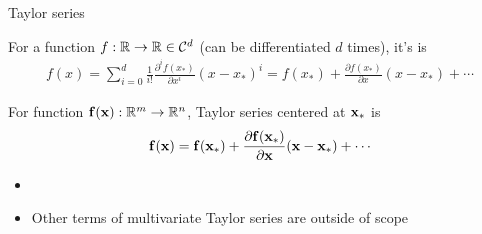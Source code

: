 \documentclass[8pt, aspectratio=149]{beamer}
\begin{document}
\begin{frame}{Taylor series}

    For a function \( f : \mathbb{R} \to \mathbb{R} \in \mathcal{C}^d \) (can be differentiated \( d \) times), 
    it's  is  
    \begin{align*}
        f(x) 
        = \sum_{i = 0}^d \frac{1}{i!} \frac{\partial^i f(x_*)}{\partial x^i} (x - x_*)^i 
        = f(x_*) + \frac{\partial f(x_*)}{\partial x} (x - x_*) + \cdots 
    \end{align*}  

    \vspace{1em} 
    For function \( \mVector{f}(\mVector{x}) : \R^m \to \R^n \), Taylor series centered at \( \mVector{x}_* \) is 
    \begin{align*}
        \mVector{f}(\mVector{x}) 
        = \mVector{f}(\mVector{x}_*) + \frac{\partial \mVector{f}(\mVector{x_*})}{\partial \mVector{x}} ( \mVector{x} - \mVector{x}_* ) + \cdots 
    \end{align*} 

    \begin{itemize}
        \item {} 
        \item Other terms of multivariate Taylor series are outside of scope 
    \end{itemize}

\end{frame}
\end{document}

